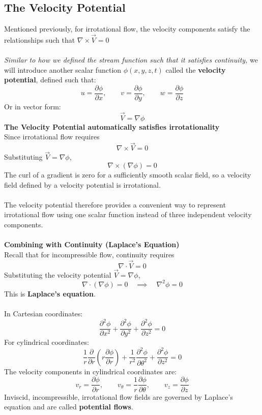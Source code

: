 ﻿\documentclass[12pt]{article}
\begin{document}
\subsection*{The Velocity Potential}
Mentioned previously, for irrotational flow, the velocity components satisfy the relationships such that $\nabla \times \vec V = 0$\\\\
\textit{Similar to how we defined the stream function such that it satisfies continuity,} we will introduce another scalar function $\phi(x,y,z,t)$ called the \textbf{velocity potential}, defined such that:
\[
u=\frac{\partial\phi}{\partial x},\qquad v=\frac{\partial\phi}{\partial y},\qquad w=\frac{\partial\phi}{\partial z}
\]
Or in vector form:
\[
\boxed{\vec V=\nabla\phi}
\]
\textbf{The Velocity Potential automatically satisfies irrotationality}\\
Since irrotational flow requires
\[
\nabla\times\vec V=0
\]
Substituting \(\vec V=\nabla\phi\),
\[
\nabla\times(\nabla\phi)=0
\]
The curl of a gradient is zero for a sufficiently smooth scalar field, so a velocity field defined by a velocity potential is irrotational.\\\\
The velocity potential therefore provides a convenient way to represent irrotational flow using one scalar function instead of three independent velocity components.\\\\
\textbf{Combining with Continuity (Laplace's Equation)}\\
Recall that for incompressible flow, continuity requires
\[\nabla\cdot\vec V=0
\]
Substituting the velocity potential \(\vec V=\nabla\phi\),
\[
\nabla\cdot(\nabla\phi)=0\quad\implies\quad \boxed{\nabla^2\phi=0}
\]
This is \textbf{Laplace's equation}.\\\\
In Cartesian coordinates:
\[
\frac{\partial^2\phi}{\partial x^2}+\frac{\partial^2\phi}{\partial y^2}+\frac{\partial^2\phi}{\partial z^2}=0
\]
For cylindrical coordinates:
\[
\frac1r\frac{\partial}{\partial r}\left(r\frac{\partial\phi}{\partial r}\right)+\frac1{r^2}\frac{\partial^2\phi}{\partial\theta^2}+\frac{\partial^2\phi}{\partial z^2}=0
\]
The velocity components in cylindrical coordinates are:
\[
v_r=\frac{\partial\phi}{\partial r},\qquad v_\theta=\frac1r\frac{\partial\phi}{\partial\theta},\qquad v_z=\frac{\partial\phi}{\partial z}
\]
Inviscid, incompressible, irrotational flow fields are governed by Laplace's equation and are called \textbf{potential flows}.
\end{document}
